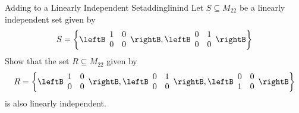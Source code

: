 \begin{example}{Adding to a Linearly Independent Set}{addinglinind}
Let $S \subseteq M_{22}$ be a linearly independent set given by 
\[
S  = \left\{ \leftB \begin{array}{rr}
1 & 0 \\
0 & 0 
\end{array} \rightB, \leftB \begin{array}{rr}
0 & 1 \\
0 & 0 
\end{array} \rightB \right\}
\]
Show that the set $R \subseteq M_{22}$ given by 
\[
R = \left\{ \leftB \begin{array}{rr}
1 & 0 \\
0 & 0 
\end{array} \rightB, \leftB \begin{array}{rr}
0 & 1 \\
0 & 0 
\end{array} \rightB, \leftB \begin{array}{rr}
0 & 0 \\
1 & 0 
\end{array} \rightB \right\}
\]
is also linearly independent.
\end{example}

